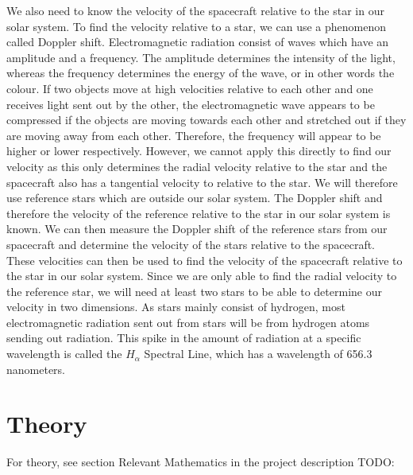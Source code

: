 \documentclass[reprint,english,notitlepage]{revtex4-2}
\begin{document}
We also need to know the velocity of the spacecraft relative to the star in our solar system.
To find the velocity relative to a star, we can use a phenomenon called Doppler shift.
Electromagnetic radiation consist of waves which have an amplitude and a frequency.
The amplitude determines the intensity of the light, whereas the frequency determines the energy of the wave, or in other words the colour.
If two objects move at high velocities relative to each other and one receives light sent out by the other, the electromagnetic wave appears to be compressed if the objects are moving towards each other and stretched out if they are moving away from each other.
Therefore, the frequency will appear to be higher or lower respectively.
However, we cannot apply this directly to find our velocity as this only determines the radial velocity relative to the star and the spacecraft also has a tangential velocity to relative to the star.
We will therefore use reference stars which are outside our solar system.
The Doppler shift and therefore the velocity of the reference relative to the star in our solar system is known.
We can then measure the Doppler shift of the reference stars from our spacecraft and determine the velocity of the stars relative to the spacecraft.
These velocities can then be used to find the velocity of the spacecraft relative to the star in our solar system.
Since we are only able to find the radial velocity to the reference star, we will need at least two stars to be able to determine our velocity in two dimensions.
As stars mainly consist of hydrogen, most electromagnetic radiation sent out from stars will be from hydrogen atoms sending out radiation.
This spike in the amount of radiation at a specific wavelength is called the $H_{\alpha}$ Spectral Line, which has a wavelength of 656.3 nanometers.


\section{Theory} \label{sec:theory}
For theory, see section Relevant Mathematics in the project description%
TODO: %
\end{document}
